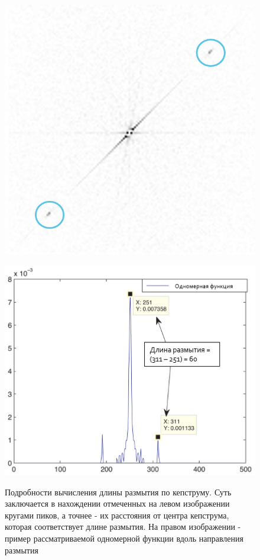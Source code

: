 \begin{figure}[H]
\begin{minipage}[h]{0.45\linewidth}
\includegraphics[width=1\linewidth, right]{pics/len/cep_inverted.png} \\ 
\end{minipage}
\hfill
\begin{minipage}[h]{0.45\linewidth}
\includegraphics[width=1\linewidth, left]{pics/len/oned.PNG} \\ 
\end{minipage}
 
\caption{Подробности вычисления длины размытия по кепструму. Суть заключается в нахождении отмеченных на левом изображении кругами пиков, а точнее - их расстояния от центра кепструма, которая соответствует длине размытия. На правом изображении - пример рассматриваемой одномерной функции вдоль направления размытия}
\label{ris:len_est_ex}
\end{figure}



